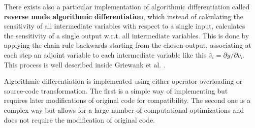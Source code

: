 \documentclass[12pt, a4paper]{article}
\begin{document}
There exists also a particular implementation of algorithmic differentiation called \textbf{reverse mode algorithmic differentiation}, which instead of calculating the sensitivity of all intermediate variables with respect to a single input, calculates the sensitivity of a single output w.r.t. all intermediate variables. This is done by applying the chain rule backwards starting from the chosen output, associating at each step an adjoint variable to each intermediate variable like this $\bar{v}_i = \partial y / \partial v_i$. This process is well described inside Griewank et al. \cite{griewank2008evaluating}.\par
Algorithmic differentiation is implemented using either operator overloading or source-code transformation. The first is a simple way of implementing but requires later modifications of original code for compatibility. The second one is a complex way but allows for a large number of computational optimizations and does not require the modification of original code.\par
\end{document}
